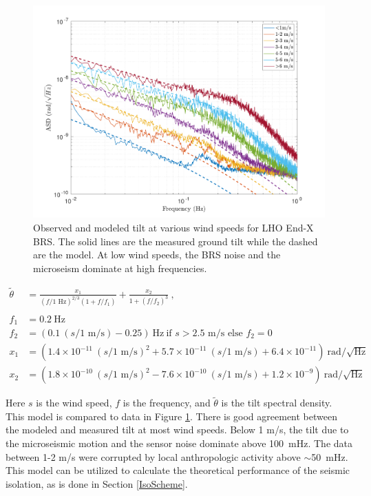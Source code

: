\documentclass [12pt, proquest]{uwthesis}[2019]
\begin{document}
\begin{figure}[!h]
\begin{center}
\includegraphics[width=\textwidth]{TiltModel.pdf}
\caption[Observed and modeled tilt vs wind speed]{Observed and modeled tilt at various wind speeds for LHO End-X BRS. The solid lines are the measured ground tilt while the dashed are the model. At low wind speeds, the BRS noise and the microseism dominate at high frequencies.}
\label{tiltModel}
\end{center}
\end{figure}

\begin{align}
\tilde{\theta}&=\frac{x_1}{(f/1\text{ Hz})^{2/3}(1+f/f_1)} +\frac{x_2}{1+(f/f_2)^3}\ ,\label{TiltModelEq}\\
\nonumber \\ 
f_1&=0.2\ \text{Hz}\nonumber \\
f_2&=(0.1\ (s/\text{1 m/s}) -0.25)\ \text{Hz}\ \text{if }s>2.5\text{ m/s}\text{ else }f_2=0\nonumber \\
x_1&=(1.4\times10^{-11}\ (s/\text{1 m/s})^2+5.7\times10^{-11}\ (s/\text{1 m/s})+6.4\times10^{-11})\ \text{rad}/\sqrt{\text{Hz}}\nonumber \\
x_2&=(1.8\times10^{-10}\ (s/\text{1 m/s})^2-7.6\times10^{-10}\ (s/\text{1 m/s})+1.2\times10^{-9})\ \text{rad}/\sqrt{\text{Hz}}\nonumber
\end{align}

Here $s$ is the wind speed, $f$ is the frequency, and $\tilde{\theta}$ is the tilt spectral density. This model is compared to data in Figure \ref{tiltModel}. There is good agreement between the modeled and measured tilt at most wind speeds. Below 1 m/s, the tilt due to the microseismic motion and the sensor noise dominate above 100~mHz. The data between 1-2 m/s were corrupted by local anthropologic activity above $\sim$50~mHz. This model can be utilized to calculate the theoretical performance of the seismic isolation, as is done in Section \ref{IsoScheme}.
\end{document}
